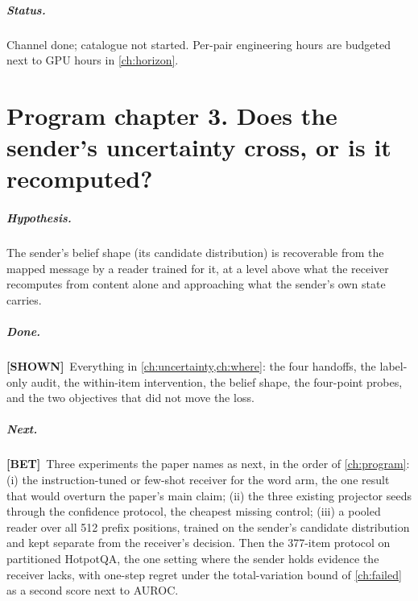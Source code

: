 \documentclass[11pt,a4paper]{report}
\newcommand{\SHOWN}{\textcolor{shownc}{\textbf{\scriptsize[SHOWN]}}}
\newcommand{\BET}{\textcolor{betc}{\textbf{\scriptsize[BET]}}}
\newcommand{\mbet}{\marginnote{\BET}}
\begin{document}
\paragraph{Status.} Channel done; catalogue not started. Per-pair engineering hours are budgeted next to GPU hours in \cref{ch:horizon}.

\chapter{Program chapter 3. Does the sender's uncertainty cross, or is it recomputed?}
\label{ch:p-uncert}

\paragraph{Hypothesis.} \mbet The sender's belief shape (its candidate distribution) is recoverable from the mapped message by a reader trained for it, at a level above what the receiver recomputes from content alone and approaching what the sender's own state carries.

\paragraph{Done.} \SHOWN\ Everything in \cref{ch:uncertainty,ch:where}: the four handoffs, the label-only audit, the within-item intervention, the belief shape, the four-point probes, and the two objectives that did not move the loss.

\paragraph{Next.} \BET\ Three experiments the paper names as next, in the order of \cref{ch:program}: (i) the instruction-tuned or few-shot receiver for the word arm, the one result that would overturn the paper's main claim; (ii) the three existing projector seeds through the confidence protocol, the cheapest missing control; (iii) a pooled reader over all 512 prefix positions, trained on the sender's candidate distribution and kept separate from the receiver's decision. Then the 377-item protocol on partitioned HotpotQA, the one setting where the sender holds evidence the receiver lacks, with one-step regret under the total-variation bound of \cref{ch:failed} as a second score next to AUROC.
\end{document}
